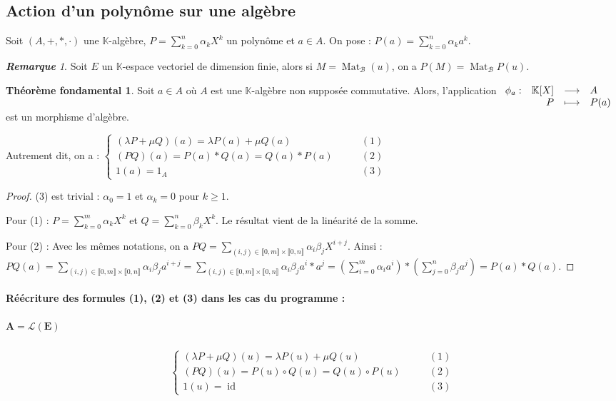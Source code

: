 \documentclass[12pt]{book}
\let\ensembleNombre\mathbb
\newcommand*\K{\ensuremath{\ensembleNombre{K}}}
\newcommand{\app}[5]{\ensuremath{
\begin{array}[t]{lrcl}
#1 : & #2 & \longrightarrow & #3 \\
    & #4 & \longmapsto & #5 \end{array}
}}
\DeclareMathOperator{\id}{id}
\DeclareMathOperator{\Mat}{Mat}
\theoremstyle{definition}
\newtheorem*{thmefond}{Théorème fondamental}
\theoremstyle{remark}
\newtheorem*{rem}{\textbf{Remarque}}
\newenvironment{fthmefond}
  {\begin{mdframed}[roundcorner=10pt, linewidth=3.5pt]\begin{thmefond}}
  {\end{thmefond}\end{mdframed}}
\begin{document}
	\subsection{Action d'un polynôme sur une algèbre}
	Soit $(A, +, *, \cdot)$ une $\K$-algèbre, $P = \sum_{k=0}^n \alpha_kX^k$ un polynôme et $a \in A$. On pose : $P(a) = \sum_{k=0}^n \alpha_k a^k$.
	
	\begin{rem}
	Soit $E$ un $\K$-espace vectoriel de dimension finie, alors si $M = \Mat_{\mathcal B}(u)$, on a $P(M) = \Mat_{\mathcal B} P(u)$.
	\end{rem}
	
	\begin{fthmefond}
	Soit $a \in A$ où $A$ est une $\K$-algèbre non supposée commutative. Alors, l'application $\app{\phi_a}{\K[X]}{A}{P}{P(a)}$ est un morphisme d'algèbre.
	\end{fthmefond}
	
	Autrement dit, on a : $\begin{cases}
							(\lambda P + \mu Q)(a) = \lambda P(a) + \mu Q(a) \qquad &(1)\\
							(PQ)(a) = P(a)*Q(a) = Q(a)*P(a) \qquad &(2)\\
							1(a) = 1_A \qquad &(3)
					       \end{cases}$
	\begin{proof}
	(3) est trivial : $\alpha_0 = 1$ et $\alpha_k = 0$ pour $k \geq 1$.
	
	Pour (1) : $P = \sum_{k=0}^m \alpha_k X^k$ et $Q = \sum_{k=0}^n \beta_k X^k$. Le résultat vient de la linéarité de la somme.
	
	Pour (2) : Avec les mêmes notations, on a $PQ = \sum_{(i,j) \in \llbracket 0, m \rrbracket \times \llbracket 0, n \rrbracket} \alpha_i \beta_j X^{i+j}$. Ainsi : $PQ(a) = \sum_{(i,j) \in \llbracket 0, m \rrbracket \times \llbracket 0, n \rrbracket} \alpha_i \beta_j a^{i+j} = \sum_{(i,j) \in \llbracket 0, m \rrbracket \times \llbracket 0, n \rrbracket} \alpha_i \beta_j a^i*a^j = \left( \sum_{i=0}^m \alpha_i a^i \right) * \left( \sum_{j=0}^n \beta_j a^j \right) = P(a) * Q(a).$
	\end{proof}
	
	\paragraph{Réécriture des formules (1), (2) et (3) dans les cas du programme : }
		\subparagraph{$\bm{A = \mathcal L(E)}$}
		\[\begin{cases}
			(\lambda P + \mu Q)(u) = \lambda P(u) + \mu Q(u) \qquad &(1)\\
			(PQ)(u) = P(u)\circ Q(u) = Q(u)\circ P(u) \qquad &(2)\\
			1(u) = \id \qquad &(3)
       \end{cases}\]
       
\end{document}
